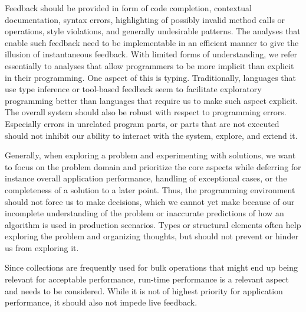 \documentclass[sigconf, 10pt]{acmart}
\begin{document}
Feedback should be provided in form of
code completion, contextual documentation,
syntax errors, highlighting of possibly invalid method calls or operations,
style violations, and generally undesirable patterns.
The analyses that enable such feedback need to be implementable
in an efficient manner to give the illusion of instantaneous feedback.
%
With limited forms of understanding,
we refer essentially to analyses
that allow programmers to be more implicit than explicit in their programming.
One aspect of this is typing.
Traditionally, languages that use type inference
or tool-based feedback seem to facilitate exploratory programming better
than languages that require us to make such aspect explicit.
%   
The overall system should also be robust with respect to programming errors.
Especially errors in unrelated program parts,
or parts that are not executed
should not inhibit our ability to interact with the system,
explore, and extend it.

Generally, when exploring a problem and experimenting with solutions,
we want to focus on the problem domain and prioritize the core aspects
while deferring for instance overall application performance,
handling of exceptional cases,
or the completeness of a solution to a later point.
Thus, the programming environment should not force us to make decisions,
which we cannot yet make because of our incomplete understanding of the problem
or inaccurate predictions of how an algorithm is used in production scenarios.
Types or structural elements often help exploring
the problem and organizing thoughts,
but should not prevent or hinder us from exploring it.

Since collections are frequently used for bulk operations
that might end up being relevant for acceptable performance,
run-time performance is a relevant aspect and needs to be considered.
While it is not of highest priority for application performance,
it should also not impede live feedback.
\end{document}

